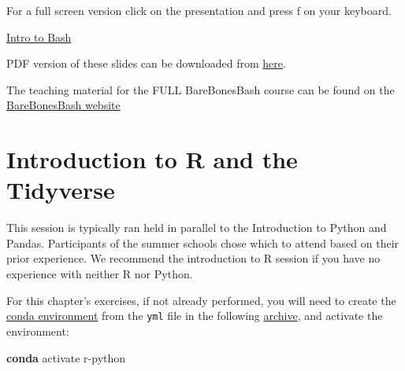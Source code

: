 \documentclass[
  letterpaper,
]{book}
\newenvironment{Shaded}{}{}
\newcommand{\ExtensionTok}[1]{\textcolor[rgb]{0.84,0.23,0.29}{\textbf{#1}}}
\newcommand{\NormalTok}[1]{\textcolor[rgb]{0.14,0.16,0.18}{#1}}
\begin{document}
For a full screen version click on the presentation and press f on your
keyboard.

\href{https://spaam-community.github.io/wss-summer-school/assets/slides/2022/1bc-barebonesbash/bbb2/session2.html}{Intro
to Bash}

PDF version of these slides can be downloaded from
\href{https://raw.githubusercontent.com/SPAAM-community/wss-summer-school/main/docs/assets/slides/2022/1bc-barebonesbash/SPAAM\%20Summer\%20School\%202022\%20-\%201C\%20-\%20BareBonesBash\%202.pdf}{here}.

The teaching material for the FULL BareBonesBash course can be found on
the \href{https://barebonesbash.github.io/}{BareBonesBash website}

\hypertarget{introduction-to-r-and-the-tidyverse}{%
\chapter{Introduction to R and the
Tidyverse}\label{introduction-to-r-and-the-tidyverse}}

\begin{tcolorbox}[enhanced jigsaw, opacitybacktitle=0.6, bottomtitle=1mm, opacityback=0, colback=white, coltitle=black, leftrule=.75mm, toprule=.15mm, title=\textcolor{quarto-callout-note-color}{\faInfo}\hspace{0.5em}{Note}, colframe=quarto-callout-note-color-frame, toptitle=1mm, arc=.35mm, left=2mm, titlerule=0mm, breakable, rightrule=.15mm, bottomrule=.15mm, colbacktitle=quarto-callout-note-color!10!white]

This session is typically ran held in parallel to the Introduction to
Python and Pandas. Participants of the summer schools chose which to
attend based on their prior experience. We recommend the introduction to
R session if you have no experience with neither R nor Python.

\end{tcolorbox}

\begin{tcolorbox}[enhanced jigsaw, opacitybacktitle=0.6, bottomtitle=1mm, opacityback=0, colback=white, coltitle=black, leftrule=.75mm, toprule=.15mm, title=\textcolor{quarto-callout-tip-color}{\faLightbulb}\hspace{0.5em}{Tip}, colframe=quarto-callout-tip-color-frame, toptitle=1mm, arc=.35mm, left=2mm, titlerule=0mm, breakable, rightrule=.15mm, bottomrule=.15mm, colbacktitle=quarto-callout-tip-color!10!white]

For this chapter's exercises, if not already performed, you will need to
create the \protect\hyperlink{creating-a-conda-environment}{conda
environment} from the \texttt{yml} file in the following
\href{https://doi.org/10.5281/zenodo.6983148}{archive}, and activate the
environment:

\begin{Shaded}
\begin{Highlighting}[]
\ExtensionTok{conda}\NormalTok{ activate r{-}python}
\end{Highlighting}
\end{Shaded}

\end{tcolorbox}
\end{document}
